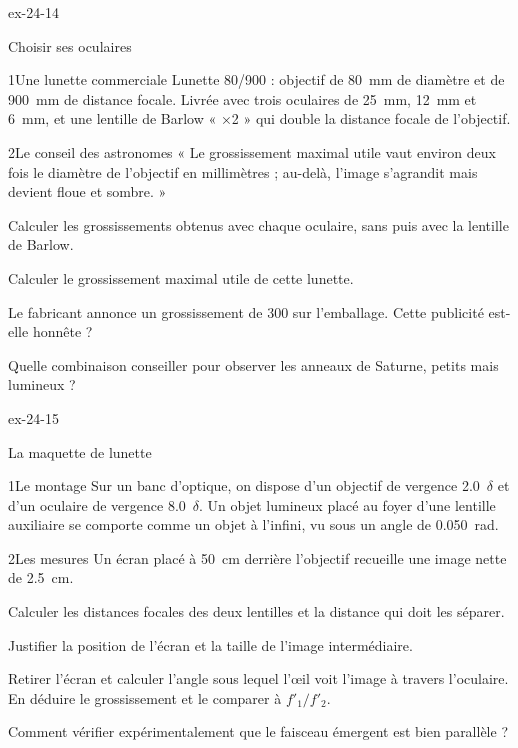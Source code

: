 \begin{blocLivre}{ex-24-14}
\begin{exercice}[3]{Choisir ses oculaires}
\begin{docu}{1}{Une lunette commerciale}
Lunette 80/900 : objectif de \qty{80}{mm} de diamètre et de \qty{900}{mm} de distance focale. Livrée avec trois oculaires de
\qty{25}{mm}, \qty{12}{mm} et \qty{6}{mm}, et une lentille de Barlow « ×2 » qui double la distance focale de l'objectif.
\end{docu}
\begin{docu}{2}{Le conseil des astronomes}
« Le grossissement maximal utile vaut environ deux fois le diamètre de l'objectif en millimètres ; au-delà, l'image
s'agrandit mais devient floue et sombre. »
\end{docu}
\begin{questions}
\item Calculer les grossissements obtenus avec chaque oculaire, sans puis avec la lentille de Barlow.
\item Calculer le grossissement maximal utile de cette lunette.
\item \initiative Le fabricant annonce un grossissement de 300 sur l'emballage. Cette publicité est-elle honnête ?
\item Quelle combinaison conseiller pour observer les anneaux de Saturne, petits mais lumineux ?
\end{questions}
\end{exercice}
\end{blocLivre}
\begin{blocLivre}{ex-24-15}
\begin{exercice}[3]{La maquette de lunette}
\begin{docu}{1}{Le montage}
Sur un banc d'optique, on dispose d'un objectif de vergence \num{+2,0}~$\delta$ et d'un oculaire de vergence \num{+8,0}~$\delta$. Un
objet lumineux placé au foyer d'une lentille auxiliaire se comporte comme un objet à l'infini, vu sous un angle de
\qty{0,050}{rad}.
\end{docu}
\begin{docu}{2}{Les mesures}
Un écran placé à \qty{50}{cm} derrière l'objectif recueille une image nette de \qty{2,5}{cm}.
\end{docu}
\begin{questions}
\item Calculer les distances focales des deux lentilles et la distance qui doit les séparer.
\item Justifier la position de l'écran et la taille de l'image intermédiaire.
\item \initiative Retirer l'écran et calculer l'angle sous lequel l'œil voit l'image à travers l'oculaire. En déduire le
grossissement et le comparer à $f'_1/f'_2$.
\item Comment vérifier expérimentalement que le faisceau émergent est bien parallèle ?
\end{questions}
\end{exercice}
\end{blocLivre}

